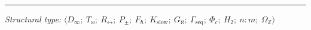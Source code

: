 \documentclass[12pt,a4paper]{article}
\begin{document}
\begin{center}
\rule{0.5\textwidth}{0.4pt}
\end{center}

\emph{Structural type:} $\langle D_{\infty};\ T_{\bowtie};\ R_{\leftrightarrow};\ P_{\pm};\ F_{\hbar};\ K_\text{slow};\ G_{\aleph};\ \Gamma_\text{seq};\ \Phi_c;\ H_2;\ n{:}m;\ \Omega_\mathbb{Z} \rangle$
\end{document}
